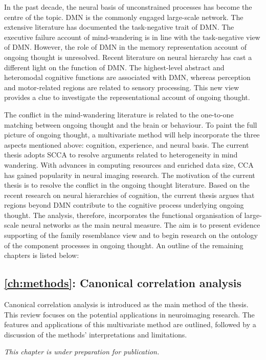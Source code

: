 In the past decade, the neural basis of unconstrained processes has become the centre of the topic. DMN is the commonly engaged large-scale network. The extensive literature has documented the task-negative trait of DMN. The executive failure account of mind-wandering is in line with the task-negative view of DMN. However, the role of DMN in the memory representation account of ongoing thought is unresolved. Recent literature on neural hierarchy has cast a different light on the function of DMN. The highest-level abstract and heteromodal cognitive functions are associated with DMN, whereas perception and motor-related regions are related to sensory processing. This new view provides a clue to investigate the representational account of ongoing thought.

The conflict in the mind-wandering literature is related to the one-to-one matching between ongoing thought and the brain or behaviour. To paint the full picture of ongoing thought, a multivariate method will help incorporate the three aspects mentioned above: cognition, experience, and neural basis. The current thesis adopts SCCA to resolve arguments related to heterogeneity in mind wandering. With advances in computing resources and enriched data size, CCA has gained popularity in neural imaging research. The motivation of the current thesis is to resolve the conflict in the ongoing thought literature. Based on the recent research on neural hierarchies of cognition, the current thesis argues that regions beyond DMN contribute to the cognitive process underlying ongoing thought. The analysis, therefore, incorporates the functional organisation of large-scale neural networks as the main neural measure. The aim is to present evidence supporting of the family resemblance view and to begin research on the ontology of the component processes in ongoing thought. An outline of the remaining chapters is listed below:

\subsection*{\cref{ch:methods}: Canonical correlation analysis}

Canonical correlation analysis is introduced as the main method of the thesis. This review focuses on the potential applications in neuroimaging research. The features and applications of this multivariate method are outlined, followed by a discussion of the methods' interpretations and limitations. 

\textit{This chapter is under preparation for publication. } 

